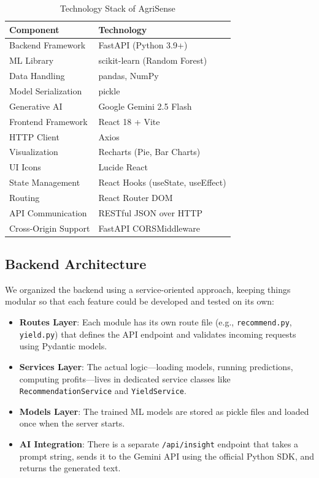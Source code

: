 \documentclass[conference]{IEEEtran}
\begin{document}
\begin{table}[htbp]
\caption{Technology Stack of AgriSense}
\label{tab:tech_stack}
\centering
\begin{tabular}{@{}ll@{}}
\toprule
\textbf{Component} & \textbf{Technology} \\
\midrule
Backend Framework & FastAPI (Python 3.9+) \\
ML Library & scikit-learn (Random Forest) \\
Data Handling & pandas, NumPy \\
Model Serialization & pickle \\
Generative AI & Google Gemini 2.5 Flash \\
Frontend Framework & React 18 + Vite \\
HTTP Client & Axios \\
Visualization & Recharts (Pie, Bar Charts) \\
UI Icons & Lucide React \\
State Management & React Hooks (useState, useEffect) \\
Routing & React Router DOM \\
API Communication & RESTful JSON over HTTP \\
Cross-Origin Support & FastAPI CORSMiddleware \\
\bottomrule
\end{tabular}
\end{table}

\subsection{Backend Architecture}
We organized the backend using a service-oriented approach, keeping things modular so that each feature could be developed and tested on its own:

\begin{itemize}
    \item \textbf{Routes Layer}: Each module has its own route file (e.g., \texttt{recommend.py}, \texttt{yield.py}) that defines the API endpoint and validates incoming requests using Pydantic models.
    \item \textbf{Services Layer}: The actual logic---loading models, running predictions, computing profits---lives in dedicated service classes like \texttt{RecommendationService} and \texttt{YieldService}.
    \item \textbf{Models Layer}: The trained ML models are stored as pickle files and loaded once when the server starts.
    \item \textbf{AI Integration}: There is a separate \texttt{/api/insight} endpoint that takes a prompt string, sends it to the Gemini API using the official Python SDK, and returns the generated text.
\end{itemize}
\end{document}
